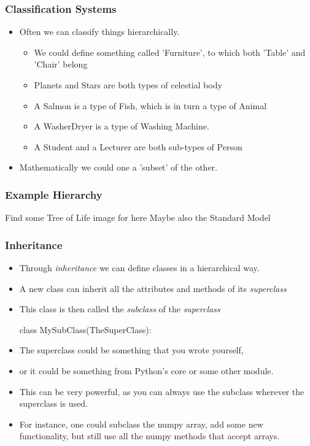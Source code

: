 \documentclass{beamer}
\begin{document}
\begin{frame}[fragile]
\frametitle{Classification Systems}
\begin{itemize}
\item Often we can classify things hierarchically.
\begin{itemize}
\item We could define something called 'Furniture', to which both 'Table' and 'Chair' belong
\item Planets and Stars are both types of celestial body
\item A Salmon is a type of Fish, which is in turn a type of Animal
\item A WasherDryer is a type of Washing Machine.
\item A Student and a Lecturer are both sub-types of Person
\end{itemize}
\item Mathematically we could one a 'subset' of the other.
\end{itemize}

\end{frame}

\begin{frame}[fragile]
\frametitle{Example Hierarchy}
Find some Tree of Life image for here
Maybe also the Standard Model

\end{frame}

\begin{frame}[fragile]
\frametitle{Inheritance}
\begin{itemize}
\item Through \emph{inheritance} we can define classes in a hierarchical way.
\item A new class can inherit all the attributes and methods of its \emph{superclass}
\item This class is then called the \emph{subclass} of the \emph{superclass}
\begin{code}
  class MySubClass(TheSuperClass):
\end{code}
\item The superclass could be something that you wrote yourself,
\item or it could be something from Python's core or some other module.
\item This can be very powerful, as you can always use the subclass wherever the superclass is used.
\item For instance, one could subclass the numpy array, add some new functionality, 
but still use all the numpy methods that accept arrays.

\end{itemize}


\end{frame}
\end{document}
